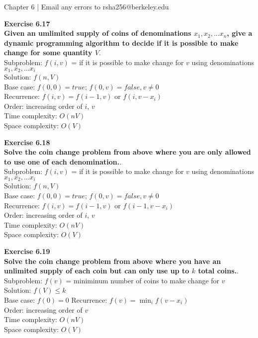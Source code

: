 \documentclass{article}
\newenvironment{problem}[2][Exercise]
    { \begin{mdframed}[backgroundcolor=gray!20] \textbf{#1 #2} \\}
    {  \end{mdframed}}
\begin{document}
\begin{mdframed}[backgroundcolor=blue!20]
Chapter 6 | Email any errors to rsha256@berkeley.edu
\end{mdframed}
 
\begin{problem}{6.17}
    \textbf{Given an umlimited supply of coins of denominations $x_1, x_2, ... x_n$, give a dynamic programming algorithm to decide if it is possible to make change for some quantity $V$}. \\
    Subproblem: $f(i, v)$ = if it is possible to make change for $v$ using denominations $x_1, x_2, ... x_i$ \\
    Solution: $f(n, V)$ \\
    Base case: $f(0, 0) = true$; $f(0, v) = false, v \neq 0$ \\
    Recurrence: $f(i, v) = f(i - 1, v)$ or $f(i, v - x_i) $ \\
    Order: increasing order of $i$, $v$ \\
    Time complexity: $O(nV)$ \\
    Space complexity: $O(V)$
\end{problem}

\begin{problem}{6.18}
    \textbf{Solve the coin change problem from above where you are only allowed to use one of each denomination.}. \\
    Subproblem: $f(i, v)$ = if it is possible to make change for $v$ using denominations $x_1, x_2, ... x_i$ \\
    Solution: $f(n, V)$ \\
    Base case: $f(0, 0) = true$; $f(0, v) = false, v \neq 0$ \\
    Recurrence: $f(i, v) = f(i - 1, v)$ or $f(i - 1, v - x_i) $ \\
    Order: increasing order of $i$, $v$ \\
    Time complexity: $O(nV)$ \\
    Space complexity: $O(V)$
\end{problem}

\begin{problem}{6.19}
    \textbf{Solve the coin change problem from above where you have an unlimited supply of each coin but can only use up to $k$ total coins.}. \\
    Subproblem: $f(v)$ = miniminum number of coins to make change for $v$ \\
    Solution: $f(V) \leq k$ \\
    Base case: $f(0) = 0$
    Recurrence: $f(v) = \min_{i}f(v - x_i)$ \\
    Order: increasing order of $v$ \\
    Time complexity: $O(nV)$ \\
    Space complexity: $O(V)$
\end{problem}
\end{document}
